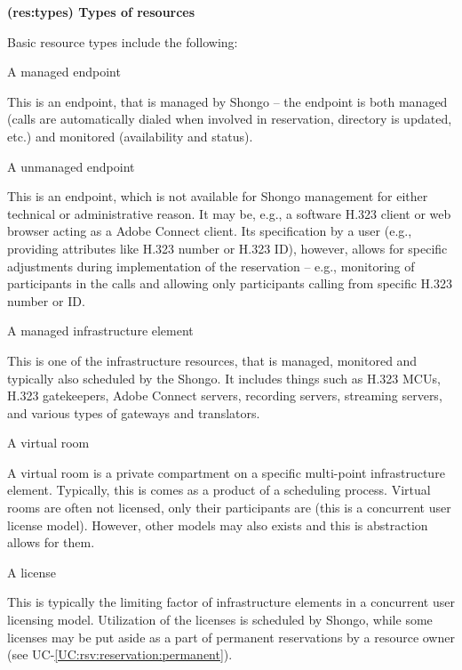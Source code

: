 \documentclass[a4paper]{report}
\makeatletter
\newcounter{UCcounter}
\newenvironment{UseCases}%
	{\begin{list}{\textbf{UC-\arabic{UCcounter}}}{\@nmbrlisttrue\def\@listctr{UCcounter}}}%
	{\end{list}}
\newcommand{\UClabel}[1]{\label{UC:#1}}
\newcommand{\UCref}[1]{UC-\ref{UC:#1}}
\newcommand{\UseCase}[2]{\item\UClabel{#2} \textbf{(#2) #1}\\ \nopagebreak}
\makeatother
\begin{document}
\begin{UseCases}

\UseCase{Types of resources}{res:types}

Basic resource types include the following:

\begin{compactdesc}

\item[A managed endpoint]

This is an endpoint, that is managed by Shongo -- the endpoint is both managed
(calls are automatically dialed when involved in reservation, directory is
updated, etc.) and monitored (availability and status).

\item[A unmanaged endpoint]

This is an endpoint, which is not available for Shongo management for either
technical or administrative reason. It may be, e.g., a software H.323 client or
web browser acting as a Adobe Connect client. Its specification by a user
(e.g., providing attributes like H.323 number or H.323 ID), however, allows for
specific adjustments during implementation of the reservation -- e.g.,
monitoring of participants in the calls and allowing only participants calling
from specific H.323 number or ID.

\item[A managed infrastructure element]

This is one of the infrastructure resources, that is managed, monitored and
typically also scheduled by the Shongo. It includes things such as H.323 MCUs,
H.323 gatekeepers, Adobe Connect servers, recording servers, streaming servers,
and various types of gateways and translators.

\item[A virtual room]

A virtual room is a private compartment on a specific multi-point
infrastructure element. Typically, this is comes as a product of a scheduling
process. Virtual rooms are often not licensed, only their participants are
(this is a concurrent user license model). However, other models may also
exists and this is abstraction allows for them.

\item[A license]

This is typically the limiting factor of infrastructure elements in a
concurrent user licensing model. Utilization of the licenses is scheduled by
Shongo, while some licenses may be put aside as a part of permanent
reservations by a resource owner (see \UCref{rsv:reservation:permanent}).


\end{compactdesc}
\end{UseCases}
\end{document}
